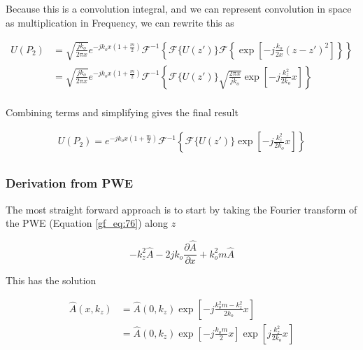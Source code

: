 Because this is a convolution integral, and we can represent convolution in space as multiplication in Frequency, we can rewrite this as

\begin{equation}
\begin{aligned}
U(P_2) &=\sqrt{\frac{jk_o}{2\pi x}}e^{-jk_ox\left(1+\frac{m}{2}\right)}\mathcal{F}^{-1}\left\{\mathcal{F}\{U(z')\}\mathcal{F}\left\{ \exp\left[-j \frac{k_o}{2x}\left(z-z'\right)^2 \right]\right\} \right\} \\
&=\sqrt{\frac{jk_o}{2\pi x}}e^{-jk_ox\left(1+\frac{m}{2}\right)}\mathcal{F}^{-1}\left\{\mathcal{F}\{U(z')\}\sqrt{\frac{2\pi x}{jk_o}}\exp\left[-j\frac{k_z^2}{2k_o}x \right] \right\} \\
\label{gf_eq:302}
\end{aligned}
\end{equation}
\renewcommand{\baselinestretch}{2} \small\normalsize

\noindent Combining terms and simplifying gives the final result

\begin{equation}
\begin{aligned}
U(P_2) = e^{-jk_ox\left(1+\frac{m}{2}\right)}\mathcal{F}^{-1}\left\{\mathcal{F}\{U(z')\}\exp\left[-j\frac{k_z^2}{2k_o}x \right] \right\} \\
\label{gf_eq:303}
\end{aligned}
\end{equation}
\renewcommand{\baselinestretch}{2} \small\normalsize


\subsubsection{Derivation from PWE}
\noindent The most straight forward approach is to start by taking the Fourier transform of the PWE (Equation \ref{gf_eq:76}) along $z$

\begin{equation}
-k_z^2\hat{A} -2jk_o\frac{\partial \hat{A}}{\partial x} +k_o^2m\hat{A}
\label{gf_eq:77}
\end{equation}
\renewcommand{\baselinestretch}{2} \small\normalsize

\noindent This has the solution

\begin{equation}
\begin{aligned}
\hat{A}(x,k_z) &= \hat{A}(0,k_z)\exp\left[-j\frac{k_o^2m-k_z^2}{2k_o}x \right] \\
&= \hat{A}(0,k_z)\exp\left[-j\frac{k_om}{2}x\right]\exp\left[j\frac{k_z^2}{2k_o}x \right]
\end{aligned}
\label{gf_eq:78}
\end{equation}
\renewcommand{\baselinestretch}{2} \small\normalsize

